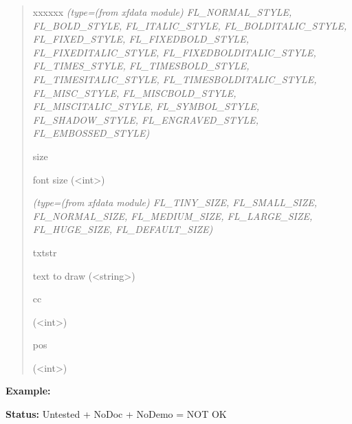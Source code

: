 \begin{boxedminipage}{\funcwidth}
\begin{quote}
\begin{Ventry}{xxxxxx}
            {\it (type=(from xfdata module) FL\_NORMAL\_STYLE, FL\_BOLD\_STYLE, FL\_ITALIC\_STYLE,
FL\_BOLDITALIC\_STYLE, FL\_FIXED\_STYLE, FL\_FIXEDBOLD\_STYLE, 
FL\_FIXEDITALIC\_STYLE, FL\_FIXEDBOLDITALIC\_STYLE, FL\_TIMES\_STYLE, 
FL\_TIMESBOLD\_STYLE, FL\_TIMESITALIC\_STYLE, FL\_TIMESBOLDITALIC\_STYLE, 
FL\_MISC\_STYLE, FL\_MISCBOLD\_STYLE, FL\_MISCITALIC\_STYLE, 
FL\_SYMBOL\_STYLE, FL\_SHADOW\_STYLE, FL\_ENGRAVED\_STYLE, 
FL\_EMBOSSED\_STYLE)}

          \item[size]

          font size ({\textless}int{\textgreater})

            {\it (type=(from xfdata module) FL\_TINY\_SIZE, FL\_SMALL\_SIZE, FL\_NORMAL\_SIZE, 
FL\_MEDIUM\_SIZE, FL\_LARGE\_SIZE, FL\_HUGE\_SIZE, FL\_DEFAULT\_SIZE)}

          \item[txtstr]

          text to draw ({\textless}string{\textgreater})

          \item[cc]

          ({\textless}int{\textgreater})

          \item[pos]

          ({\textless}int{\textgreater})

        \end{Ventry}

      \end{quote}

\textbf{Example:} 

\textbf{Status:} Untested + NoDoc + NoDemo = NOT OK



    \end{boxedminipage}

    \label{xformslib:library:fl_drw_box}

    \vspace{0.5ex}


